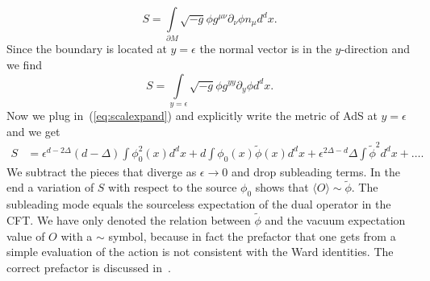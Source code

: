 \documentclass{PoS}
\begin{document}
\begin{appendix}
\begin{equation}
S = \int\limits_{\partial M} \sqrt{-g} \phi g^{\mu\nu}\partial_\nu\phi n_\mu d^d x.
\end{equation} 
Since the boundary is located at $y=\epsilon$ the normal vector is in the $y$-direction and we find
\begin{equation}
S = \int\limits_{y=\epsilon} \sqrt{-g} \phi g^{yy}\partial_y \phi d^d x.
\end{equation}
Now we plug in~(\ref{eq:scalexpand}) and explicitly write the metric of AdS at $y=\epsilon$ and we get
\begin{align}
S &= \epsilon^{d-2\Delta}(d-\Delta)\int \phi_0^2(x) d^d x + d \int \phi_0(x)\tilde{\phi}(x) d^d x + \epsilon^{2\Delta-d} \Delta \int \tilde{\phi}^2 d^d x + \ldots.
\end{align}
We subtract the pieces that diverge as $\epsilon\rightarrow 0$ and drop subleading terms. In the end a variation of $S$ with respect to the source $\phi_0$ shows that $\langle O \rangle \sim \tilde{\phi}$. The subleading mode equals the sourceless expectation of the dual operator in the CFT. We have only denoted the relation between $\tilde{\phi}$ and the vacuum expectation value of $O$ with a $\sim$ symbol, because in fact the prefactor that one gets from a simple evaluation of the action is not consistent with the Ward identities. The correct prefactor is discussed in~\cite{Freedman:1998tz}.

\end{appendix}
\end{document}
